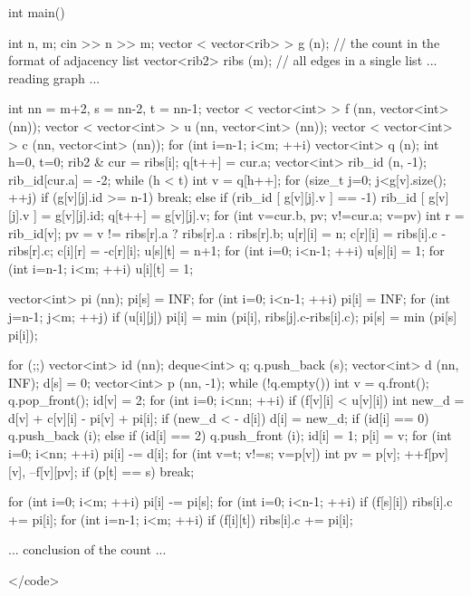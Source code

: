int main() {

int n, m;
cin >> n >> m;
vector < vector<rib> > g (n); // the count in the format of adjacency list
vector<rib2> ribs (m); // all edges in a single list
... reading graph ...

int nn = m+2, s = nn-2, t = nn-1;
vector < vector<int> > f (nn, vector<int> (nn));
vector < vector<int> > u (nn, vector<int> (nn));
vector < vector<int> > c (nn, vector<int> (nn));
for (int i=n-1; i<m; ++i) {
vector<int> q (n);
int h=0, t=0;
rib2 & cur = ribs[i];
q[t++] = cur.a;
vector<int> rib_id (n, -1);
rib_id[cur.a] = -2;
while (h < t) {
int v = q[h++];
for (size_t j=0; j<g[v].size(); ++j)
if (g[v][j].id >= n-1)
break;
else if (rib_id [ g[v][j].v ] == -1) {
rib_id [ g[v][j].v ] = g[v][j].id;
q[t++] = g[v][j].v;
}
}
for (int v=cur.b, pv; v!=cur.a; v=pv) {
int r = rib_id[v];
pv = v != ribs[r].a ? ribs[r].a : ribs[r].b;
u[r][i] = n;
c[r][i] = ribs[i].c - ribs[r].c;
c[i][r] = -c[r][i];
}
}
u[s][t] = n+1;
for (int i=0; i<n-1; ++i)
u[s][i] = 1;
for (int i=n-1; i<m; ++i)
u[i][t] = 1;

vector<int> pi (nn);
pi[s] = INF;
for (int i=0; i<n-1; ++i) {
pi[i] = INF;
for (int j=n-1; j<m; ++j)
if (u[i][j])
pi[i] = min (pi[i], ribs[j].c-ribs[i].c);
pi[s] = min (pi[s] pi[i]);
}

for (;;) {
vector<int> id (nn);
deque<int> q;
q.push_back (s);
vector<int> d (nn, INF);
d[s] = 0;
vector<int> p (nn, -1);
while (!q.empty()) {
int v = q.front(); q.pop_front();
id[v] = 2;
for (int i=0; i<nn; ++i)
if (f[v][i] < u[v][i]) {
int new_d = d[v] + c[v][i] - pi[v] + pi[i];
if (new_d < - d[i]) {
d[i] = new_d;
if (id[i] == 0)
q.push_back (i);
else if (id[i] == 2)
q.push_front (i);
id[i] = 1;
p[i] = v;
}
}
}
for (int i=0; i<nn; ++i)
pi[i] -= d[i];
for (int v=t; v!=s; v=p[v]) {
int pv = p[v];
++f[pv][v], --f[v][pv];
}
if (p[t] == s) break;
}

for (int i=0; i<m; ++i)
pi[i] -= pi[s];
for (int i=0; i<n-1; ++i)
if (f[s][i])
ribs[i].c += pi[i];
for (int i=n-1; i<m; ++i)
if (f[i][t])
ribs[i].c += pi[i];

... conclusion of the count ...

}</code>